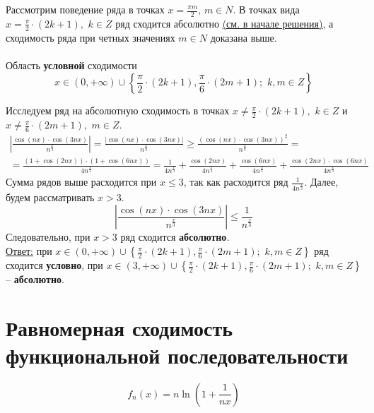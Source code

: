 \documentclass[a5paper, 10pt]{article}
\theoremstyle{definition}
\theoremstyle{plain}
\theoremstyle{remark}
\begin{document}
Рассмотрим поведение ряда в точках $x = \frac{\pi m}{2}, \, m \in N$. В точках вида $x = \frac{\pi}{2} \cdot (2k + 1), \,\, k \in  Z$ ряд сходится абсолютно \hyperlink{pdf}{ (см. в начале решения)}, а сходимость ряда при четных значениях $m \in N$ доказана выше.\\\\
Область \textbf{условной} сходимости  $$x \in (0, + \infty)  \cup \left\{  \frac{\pi}{2} \cdot (2k + 1), \frac{\pi}{6} \cdot (2m + 1); \,\, k ,  m\in Z\right\}$$

Исследуем ряд на абсолютную сходимость в точках  $x \neq \frac{\pi}{2} \cdot (2k + 1), \,\, k \in Z$  и $x \neq \frac{\pi}{6} \cdot (2m + 1), \,\, m \in Z$.
\begin{multline*}
\left| \frac{\cos( nx) \cdot \cos (3nx) }{n^{\frac{x}{3}}}  \right| =  \frac{\left|\cos( nx) \cdot \cos (3nx)\right| }{n^{\frac{x}{3}}}
\geq   \frac{\left(\cos( nx) \cdot \cos (3nx)\right)^2 }{n^{\frac{x}{3}}} = \\
= \frac{\left(1 + \cos(2 nx)\right) \cdot \left(1 +  \cos (6nx)\right)}{4n^{\frac{x}{3}}} =
\frac{1}{4n^{\frac{x}{3}}}+\frac{ \cos(2 nx)}{4n^{\frac{x}{3}}}+\frac{\cos (6nx)}{4n^{\frac{x}{3}}}+\frac{\cos(2 nx) \cdot \cos (6nx)}{4n^{\frac{x}{3}}}
\end{multline*}
Сумма рядов выше расходится при $x \leq 3$, так как расходится ряд $\frac{1}{4n^{\frac{x}{3}}}$. Далее, будем рассматривать $x > 3$.
\begin{equation*}
\left| \frac{\cos( nx) \cdot \cos (3nx) }{n^{\frac{x}{3}}}  \right| \leq  \frac{1}{n^{\frac{x}{3}}}
\end{equation*}
Следовательно, при $x > 3$ ряд сходится \textbf{абсолютно}.\\
 
\underline{Ответ:} при $x \in (0, + \infty)  \cup \left\{  \frac{\pi}{2} \cdot (2k + 1), \frac{\pi}{6} \cdot (2m + 1); \,\, k ,  m\in Z\right\}$  ряд сходится \textbf{условно}, при $x \in (3, + \infty)  \cup \left\{  \frac{\pi}{2} \cdot (2k + 1), \frac{\pi}{6} \cdot (2m + 1); \,\, k ,  m\in Z\right\}$  -- \textbf{абсолютно}.


\newpage
\section{Равномерная сходимость функциональной последовательности}
\begin{equation*}
f_n (x) = n \ln \left( 1+ \frac{1}{nx} \right)
\end{equation*}
\end{document}
